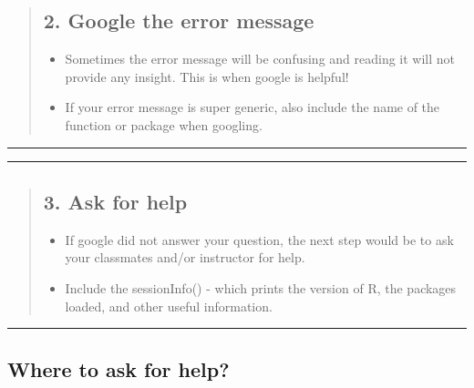 \documentclass[
]{book}
\providecommand{\tightlist}{%
  \setlength{\itemsep}{0pt}\setlength{\parskip}{0pt}}
\begin{document}
\begin{quote}
\hypertarget{google-the-error-message}{%
\subsection*{2. Google the error message}\label{google-the-error-message}}

\begin{itemize}
\tightlist
\item
  Sometimes the error message will be confusing and reading it will not provide any insight. This is when google is helpful!
\item
  If your error message is super generic, also include the name of the function or package when googling.
\end{itemize}
\end{quote}

\begin{center}\rule{0.5\linewidth}{0.5pt}\end{center}

\begin{center}\rule{0.5\linewidth}{0.5pt}\end{center}

\begin{quote}
\hypertarget{ask-for-help}{%
\subsection*{3. Ask for help}\label{ask-for-help}}

\begin{itemize}
\tightlist
\item
  If google did not answer your question, the next step would be to ask your classmates and/or instructor for help.
\item
  Include the sessionInfo() - which prints the version of R, the packages loaded, and other useful information.
\end{itemize}
\end{quote}

\begin{center}\rule{0.5\linewidth}{0.5pt}\end{center}

\hypertarget{where-to-ask-for-help}{%
\subsection*{Where to ask for help?}\label{where-to-ask-for-help}}
\end{document}
